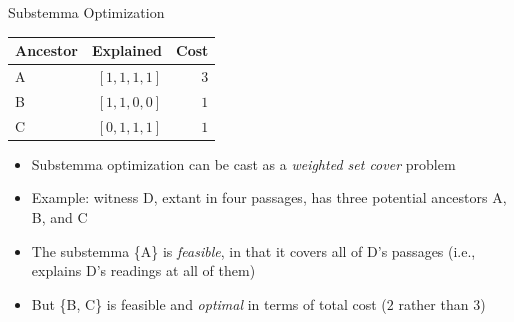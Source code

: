 \documentclass[10pt]{beamer}
\begin{document}
	\begin{frame}{Substemma Optimization}
		\begin{table}
			\centering
			\begin{tabular}{lrr}
				Ancestor & Explained & Cost\\
				\hline
				A & $[1,1,1,1]$ & $3$\\
				B & $[1,1,0,0]$ & $1$\\
				C & $[0,1,1,1]$ & $1$\\
			\end{tabular}
		\end{table}
		\begin{itemize}
			\item Substemma optimization can be cast as a \emph{weighted set cover} problem
			\item Example: witness D, extant in four passages, has three potential ancestors A, B, and C
			\item The substemma \{A\} is \emph{feasible}, in that it covers all of D's passages (i.e., explains D's readings at all of them)
			\item But \{B, C\} is feasible and \emph{optimal} in terms of total cost ($2$ rather than $3$)
		\end{itemize}
	\end{frame}
\end{document}
